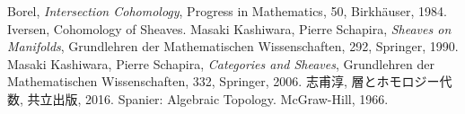 \begin{thebibliography}{20} 
     Borel, 
    \textit{Intersection Cohomology}, 
    Progress in Mathematics, 50, Birkh\"auser, 1984.
     Iversen, Cohomology of Sheaves.
 Masaki Kashiwara, Pierre Schapira, 
    \textit{Sheaves on Manifolds}, 
    Grundlehren der Mathematischen Wissenschaften, 292, Springer, 1990.
 Masaki Kashiwara, Pierre Schapira, 
    \textit{Categories and Sheaves}, 
    Grundlehren der Mathematischen Wissenschaften, 332, Springer, 2006.
 志甫淳, 層とホモロジー代数, 共立出版, 2016.
 Spanier: Algebraic Topology. McGraw-Hill, 1966.
\end{thebibliography}




